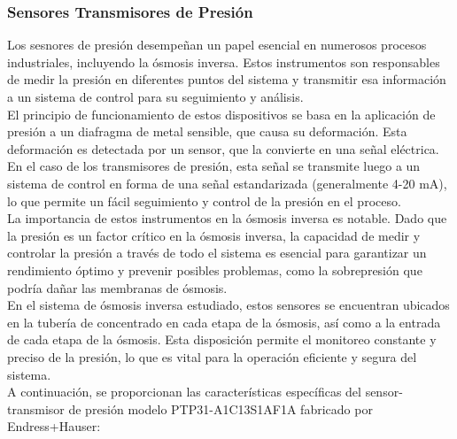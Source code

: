 \subsubsection{Sensores Transmisores de Presión} \label{sec:sensor_presion}

Los sesnores de presión desempeñan un papel esencial en numerosos procesos industriales, 
incluyendo la ósmosis inversa. Estos instrumentos son responsables de medir la presión en diferentes puntos 
del sistema y transmitir esa información a un sistema de control para su seguimiento y análisis.\\

El principio de funcionamiento de estos dispositivos se basa en la aplicación de presión a un diafragma de 
metal sensible, que causa su deformación. Esta deformación es detectada por un sensor, que la convierte en 
una señal eléctrica. En el caso de los transmisores de presión, esta señal se transmite luego a un sistema de control en forma de una señal estandarizada (generalmente 4-20 mA), lo que permite un fácil seguimiento y control de la presión en el proceso.\\

La importancia de estos instrumentos en la ósmosis inversa es notable. Dado que la presión es un factor 
crítico en la ósmosis inversa, la capacidad de medir y controlar la presión a través de todo el sistema 
es esencial para garantizar un rendimiento óptimo y prevenir posibles problemas, como la sobrepresión 
que podría dañar las membranas de ósmosis.\\

En el sistema de ósmosis inversa estudiado, estos sensores se encuentran 
ubicados en la tubería de concentrado en cada etapa de la ósmosis, así como a la entrada de cada etapa
de la ósmosis. Esta disposición permite el monitoreo constante y preciso de la presión, lo que es 
vital para la operación eficiente y segura del sistema.\\

A continuación, se proporcionan las características específicas del sensor-transmisor de presión
modelo PTP31-A1C13S1AF1A fabricado por Endress+Hauser:\\



